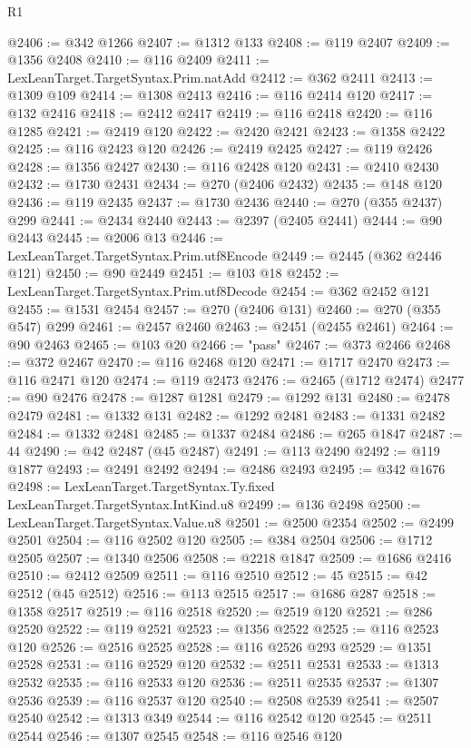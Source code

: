 \begin{lexlean}{R1}
\begin{coremodule}
@2406 := @342 @1266
@2407 := @1312 @133
@2408 := @119 @2407
@2409 := @1356 @2408
@2410 := @116 @2409
@2411 := LexLeanTarget.TargetSyntax.Prim.natAdd
@2412 := @362 @2411
@2413 := @1309 @109
@2414 := @1308 @2413
@2416 := @116 @2414 @120
@2417 := @132 @2416
@2418 := @2412 @2417
@2419 := @116 @2418
@2420 := @116 @1285
@2421 := @2419 @120
@2422 := @2420 @2421
@2423 := @1358 @2422
@2425 := @116 @2423 @120
@2426 := @2419 @2425
@2427 := @119 @2426
@2428 := @1356 @2427
@2430 := @116 @2428 @120
@2431 := @2410 @2430
@2432 := @1730 @2431
@2434 := @270 (@2406 @2432)
@2435 := @148 @120
@2436 := @119 @2435
@2437 := @1730 @2436
@2440 := @270 (@355 @2437) @299
@2441 := @2434 @2440
@2443 := @2397 (@2405 @2441)
@2444 := @90 @2443
@2445 := @2006 @13
@2446 := LexLeanTarget.TargetSyntax.Prim.utf8Encode
@2449 := @2445 (@362 @2446 @121)
@2450 := @90 @2449
@2451 := @103 @18
@2452 := LexLeanTarget.TargetSyntax.Prim.utf8Decode
@2454 := @362 @2452 @121
@2455 := @1531 @2454
@2457 := @270 (@2406 @131)
@2460 := @270 (@355 @547) @299
@2461 := @2457 @2460
@2463 := @2451 (@2455 @2461)
@2464 := @90 @2463
@2465 := @103 @20
@2466 := "pass"
@2467 := @373 @2466
@2468 := @372 @2467
@2470 := @116 @2468 @120
@2471 := @1717 @2470
@2473 := @116 @2471 @120
@2474 := @119 @2473
@2476 := @2465 (@1712 @2474)
@2477 := @90 @2476
@2478 := @1287 @1281
@2479 := @1292 @131
@2480 := @2478 @2479
@2481 := @1332 @131
@2482 := @1292 @2481
@2483 := @1331 @2482
@2484 := @1332 @2481
@2485 := @1337 @2484
@2486 := @265 @1847
@2487 := 44
@2490 := @42 @2487 (@45 @2487)
@2491 := @113 @2490
@2492 := @119 @1877
@2493 := @2491 @2492
@2494 := @2486 @2493
@2495 := @342 @1676
@2498 := LexLeanTarget.TargetSyntax.Ty.fixed LexLeanTarget.TargetSyntax.IntKind.u8
@2499 := @136 @2498
@2500 := LexLeanTarget.TargetSyntax.Value.u8
@2501 := @2500 @2354
@2502 := @2499 @2501
@2504 := @116 @2502 @120
@2505 := @384 @2504
@2506 := @1712 @2505
@2507 := @1340 @2506
@2508 := @2218 @1847
@2509 := @1686 @2416
@2510 := @2412 @2509
@2511 := @116 @2510
@2512 := 45
@2515 := @42 @2512 (@45 @2512)
@2516 := @113 @2515
@2517 := @1686 @287
@2518 := @1358 @2517
@2519 := @116 @2518
@2520 := @2519 @120
@2521 := @286 @2520
@2522 := @119 @2521
@2523 := @1356 @2522
@2525 := @116 @2523 @120
@2526 := @2516 @2525
@2528 := @116 @2526 @293
@2529 := @1351 @2528
@2531 := @116 @2529 @120
@2532 := @2511 @2531
@2533 := @1313 @2532
@2535 := @116 @2533 @120
@2536 := @2511 @2535
@2537 := @1307 @2536
@2539 := @116 @2537 @120
@2540 := @2508 @2539
@2541 := @2507 @2540
@2542 := @1313 @349
@2544 := @116 @2542 @120
@2545 := @2511 @2544
@2546 := @1307 @2545
@2548 := @116 @2546 @120

\end{coremodule}
\end{lexlean}

